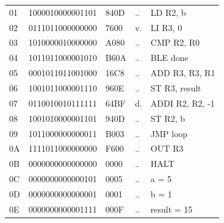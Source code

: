 \begin{tcolorbox}[stepbox, title={Instruction 22 \hfill ticks 64 to 66 \quad ADDI R2, R2, -1}]
{\begin{tabular}{@{}lllll@{}}
01 & 1000010000001101 & 840D & .. & LD R2, b\\
02 & 0111011000000000 & 7600 & v. & LI R3, 0\\
03 & 1010000010000000 & A080 & .. & CMP R2, R0\\
04 & 1011011000001010 & B60A & .. & BLE done\\
05 & 0001011011001000 & 16C8 & .. & ADD R3, R3, R1\\
06 & 1001011000001110 & 960E & .. & ST R3, result\\
07 & 0110010010111111 & 64BF & d. & ADDI R2, R2, -1\\
\rowcolor{pcc}08 & 1001010000001101 & 940D & .. & ST R2, b\\
09 & 1011000000000011 & B003 & .. & JMP loop\\
0A & 1111011000000000 & F600 & .. & OUT R3\\
0B & 0000000000000000 & 0000 & .. & HALT\\
\rowcolor{datac}0C & 0000000000000101 & 0005 & .. & a = 5\\
\rowcolor{datac}0D & 0000000000000001 & 0001 & .. & b = 1\\
\rowcolor{datac}0E & 0000000000001111 & 000F & .. & result = 15\\
\end{tabular}}
\end{tcolorbox}\par\vspace{3pt}

